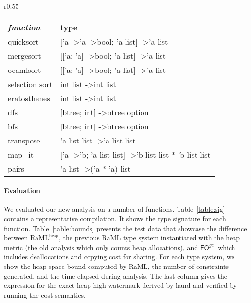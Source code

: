 \documentclass{easychair}
\newcommand{\ms}[1]{\ensuremath{\mathsf{#1}}}
\newcommand{\fogc}{\ms{FO}^{gc}}
\newcommand{\foheap}{\text{RaML}^{\ms{heap}}}
\theoremstyle{definition}
\begin{document}
\label{sect:evaluation}
\begin{wraptable}{r}{0.55\textwidth}
\small
	\vspace{-20pt}
		\begin{center}
	\begin{tabular}{ll}
		\hline
		\textit{\textbf{function}} & type \\ \hline
		quicksort & {[}'a -\textgreater 'a -\textgreater bool; 'a list{]} -\textgreater 'a list \\
		mergesort & {[}{[}'a; 'a{]} -\textgreater bool; 'a list{]} -\textgreater 'a list \\
		ocamlsort & {[}{[}'a; 'a{]} -\textgreater bool; 'a list{]} -\textgreater 'a list \\
		selection sort & int list -\textgreater int list \\
		eratosthenes & int list -\textgreater int list \\
		dfs & {[}btree; int{]} -\textgreater btree option \\
		bfs & {[}btree; int{]} -\textgreater btree option \\
		transpose & 'a list list -\textgreater 'a list list \\
		map\_it & {[}'a -\textgreater 'b; 'a list list{]} -\textgreater 'b list list * 'b list list\\
		pairs & 'a list -\textgreater ('a * 'a) list \\ \hline
	\end{tabular}
			\end{center}
				\vspace{-10pt}
			\caption{Signature of Test Functions}
		\vspace{-10pt}
\label{table:sig}
\end{wraptable}

\paragraph{Evaluation}
We evaluated our new analysis on a number of functions. Table~\ref{table:sig} contains a representative compilation.
It shows the type signature for each function.
Table~\ref{table:bounds} presents the test data that
showcase the difference between $\foheap$, the previous RaML type system instantiated with the
heap metric (the old analysis which only counts 
heap allocations), and $\fogc$, which includes deallocations and copying cost for sharing.
For each type system, we show the heap space bound computed by RaML, 
the number of constraints generated, and the time elapsed during analysis. The last column gives
the expression for the exact heap high watermark derived by hand and verified by running the 
cost semantics.
\end{document}

